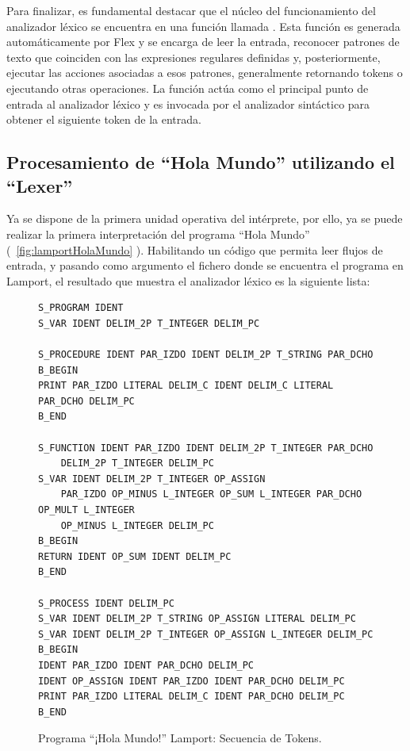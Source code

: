 Para finalizar, es fundamental destacar que el núcleo del funcionamiento del analizador léxico se encuentra en una función llamada . Esta función es generada automáticamente por Flex y se encarga de leer la entrada, reconocer patrones de texto que coinciden con las expresiones regulares definidas y, posteriormente, ejecutar las acciones asociadas a esos patrones, generalmente retornando tokens o ejecutando otras operaciones. La función  actúa como el principal punto de entrada al analizador léxico y es invocada por el analizador sintáctico para obtener el siguiente token de la entrada.

\newpage

\subsection{Procesamiento de ``Hola Mundo'' utilizando el ``Lexer''}
Ya se dispone de la primera unidad operativa del intérprete, por ello, ya se puede realizar la primera interpretación del programa ``Hola Mundo'' (~\ref{fig:lamportHolaMundo} ). Habilitando un código que permita leer flujos de entrada, y pasando como argumento el fichero donde se encuentra el programa en Lamport, el resultado que muestra el analizador léxico es la siguiente lista:

\begin{figure}[h]
\begin{verbatim}
S_PROGRAM IDENT 
S_VAR IDENT DELIM_2P T_INTEGER DELIM_PC 

S_PROCEDURE IDENT PAR_IZDO IDENT DELIM_2P T_STRING PAR_DCHO 
B_BEGIN 
PRINT PAR_IZDO LITERAL DELIM_C IDENT DELIM_C LITERAL PAR_DCHO DELIM_PC
B_END

S_FUNCTION IDENT PAR_IZDO IDENT DELIM_2P T_INTEGER PAR_DCHO 
    DELIM_2P T_INTEGER DELIM_PC 
S_VAR IDENT DELIM_2P T_INTEGER OP_ASSIGN
    PAR_IZDO OP_MINUS L_INTEGER OP_SUM L_INTEGER PAR_DCHO OP_MULT L_INTEGER 
    OP_MINUS L_INTEGER DELIM_PC
B_BEGIN 
RETURN IDENT OP_SUM IDENT DELIM_PC 
B_END 

S_PROCESS IDENT DELIM_PC 
S_VAR IDENT DELIM_2P T_STRING OP_ASSIGN LITERAL DELIM_PC
S_VAR IDENT DELIM_2P T_INTEGER OP_ASSIGN L_INTEGER DELIM_PC
B_BEGIN 
IDENT PAR_IZDO IDENT PAR_DCHO DELIM_PC 
IDENT OP_ASSIGN IDENT PAR_IZDO IDENT PAR_DCHO DELIM_PC 
PRINT PAR_IZDO LITERAL DELIM_C IDENT PAR_DCHO DELIM_PC 
B_END
\end{verbatim}
\caption{Programa ``¡Hola Mundo!'' Lamport: Secuencia de Tokens.}
\label{fig:tokensHolaMundo}
\end{figure}


